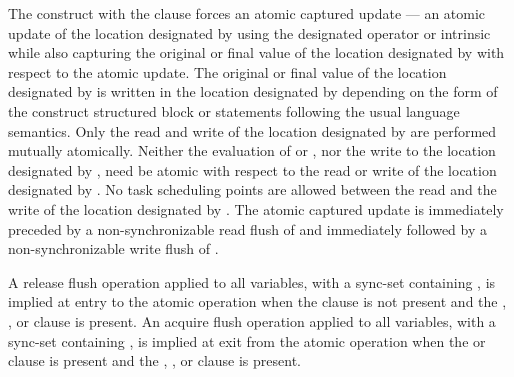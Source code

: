 The  construct with the  clause forces an atomic
captured update --- an atomic update of the 
location designated by  using the designated operator or intrinsic while also capturing 
the original or final value of the location designated by  with respect to the atomic 
update. The original or final value of the location designated by  is written in the 
location designated by  depending on the form of the  construct structured 
block or statements following the usual language semantics. Only the read and write of 
the location designated by  are performed mutually atomically. Neither the evaluation 
of  or , nor the write to the location designated by , need be atomic with
respect to the read or write of the location designated by . No task scheduling points 
are allowed between the read and the write of the location designated by
. The atomic captured update is immediately preceded by a
non-synchronizable read flush of  and immediately followed by a
non-synchronizable write flush of .

A release flush operation applied to all variables, with a
sync-set containing , is implied at entry to the atomic operation when
the  clause is not present and the , ,
or  clause is present.  An acquire flush
operation applied to all variables, with a sync-set containing , is
implied at exit from the atomic operation when the  or
 clause is present and the , , or
 clause is present. 

% 

